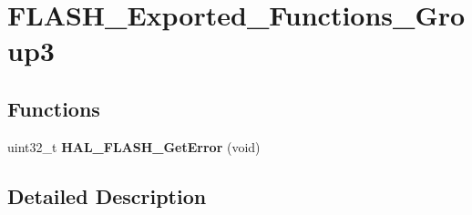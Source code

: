 \hypertarget{group___f_l_a_s_h___exported___functions___group3}{\section{F\-L\-A\-S\-H\-\_\-\-Exported\-\_\-\-Functions\-\_\-\-Group3}
\label{group___f_l_a_s_h___exported___functions___group3}
}
\subsection*{Functions}
\begin{DoxyCompactItemize}
\item 
\hypertarget{group___f_l_a_s_h___exported___functions___group3_ga20e71ba6b2a09cd5b9f0bd369f842de3}{uint32\-\_\-t {\bfseries H\-A\-L\-\_\-\-F\-L\-A\-S\-H\-\_\-\-Get\-Error} (void)}\label{group___f_l_a_s_h___exported___functions___group3_ga20e71ba6b2a09cd5b9f0bd369f842de3}

\end{DoxyCompactItemize}


\subsection{Detailed Description}
